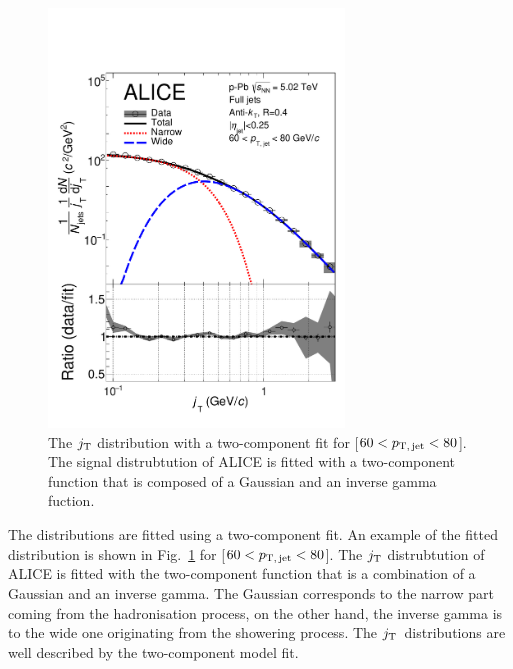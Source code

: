 \newpage


\begin{figure}[t]
  \begin{center}
  \includegraphics[width=0.7\textwidth]{newfigures/JtSignalFinalFitJetPt5.pdf}
  \caption{The $j_{\rm T}$ distribution with a two-component fit for \unit[$60<p_\mathrm{T,\,jet}<80$]{\GeVc}. The signal distrubtution of ALICE is fitted with a two-component function that is composed of a Gaussian and an inverse gamma fuction. }
  \label{fig:fits}
  \end{center}
  \end{figure}
  
The distributions are fitted using a two-component fit. An example of the fitted distribution is shown in Fig.~\ref{fig:fits} for \unit[$60<p_\mathrm{T,\,jet}<80$]{\GeVc}. The $j_{\rm T}$ distrubtution of ALICE is fitted with the two-component function that is a combination of a Gaussian and an inverse gamma. The Gaussian corresponds to the narrow part coming from the hadronisation process, on the other hand, the inverse gamma is to the wide one originating from the showering process. The $j_{\rm T}$ distributions are well described by the two-component model fit.



